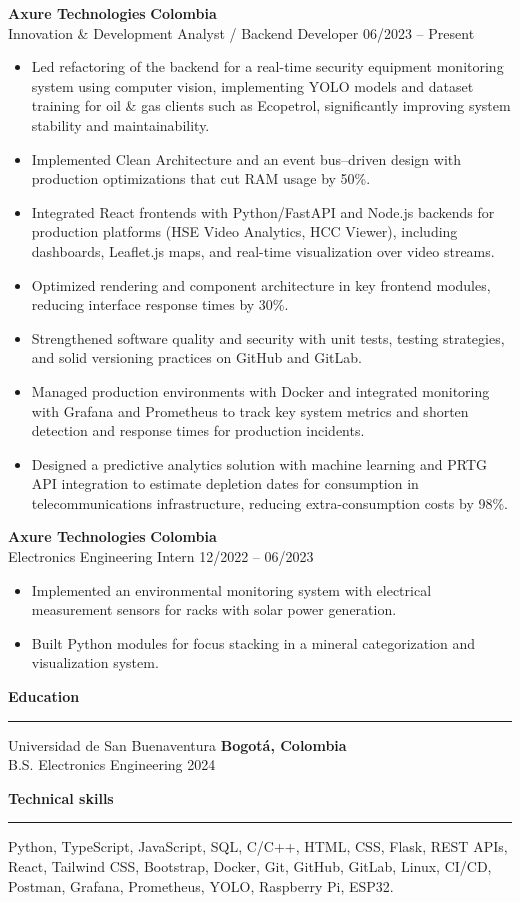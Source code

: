 \documentclass[10pt,a4paper]{article}
\newcommand{\sectionline}[1]{
\vspace{4pt}
\begin{center}
\textbf{\large #1}
\end{center}
\vspace{-1.5mm}
\hrule
\vspace{3pt}
}
\newcommand{\expentry}[4]{
\textbf{#1} \hfill \textbf{#2}\\
#3 \hfill #4
}
\newcommand{\eduentry}[4]{
#1 \hfill \textbf{#2}\\
#3 \hfill #4
}
\begin{document}
\expentry{Axure Technologies}{Colombia}{Innovation \& Development Analyst / Backend Developer}{06/2023 -- Present}
\begin{itemize}
    \item Led refactoring of the backend for a real-time security equipment monitoring system using computer vision, implementing YOLO models and dataset training for oil \& gas clients such as Ecopetrol, significantly improving system stability and maintainability.
    \item Implemented Clean Architecture and an event bus--driven design with production optimizations that cut RAM usage by 50\%.
    \item Integrated React frontends with Python/FastAPI and Node.js backends for production platforms (HSE Video Analytics, HCC Viewer), including dashboards, Leaflet.js maps, and real-time visualization over video streams.
    \item Optimized rendering and component architecture in key frontend modules, reducing interface response times by 30\%.
    \item Strengthened software quality and security with unit tests, testing strategies, and solid versioning practices on GitHub and GitLab.
    \item Managed production environments with Docker and integrated monitoring with Grafana and Prometheus to track key system metrics and shorten detection and response times for production incidents.
    \item Designed a predictive analytics solution with machine learning and PRTG API integration to estimate depletion dates for consumption in telecommunications infrastructure, reducing extra-consumption costs by 98\%.
\end{itemize}

\expentry{Axure Technologies}{Colombia}{Electronics Engineering Intern}{12/2022 -- 06/2023}
\begin{itemize}
    \item Implemented an environmental monitoring system with electrical measurement sensors for racks with solar power generation.
    \item Built Python modules for focus stacking in a mineral categorization and visualization system.
\end{itemize}

\sectionline{Education}
\eduentry{Universidad de San Buenaventura}{Bogot\'a, Colombia}{B.S. Electronics Engineering}{2024}

\sectionline{Technical skills}
Python, TypeScript, JavaScript, SQL, C/C++, HTML, CSS, Flask, REST APIs, React, Tailwind CSS, Bootstrap, Docker, Git, GitHub, GitLab, Linux, CI/CD, Postman, Grafana, Prometheus, YOLO, Raspberry Pi, ESP32.
\end{document}
